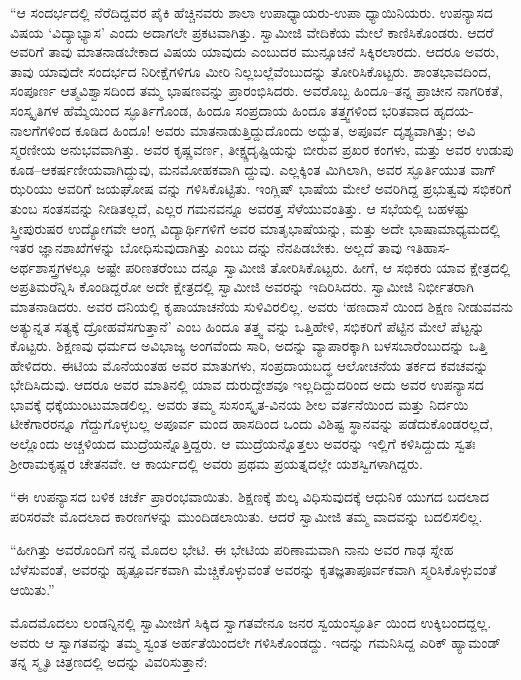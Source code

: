 “ಆ ಸಂದರ್ಭದಲ್ಲಿ ನೆರೆದಿದ್ದವರ ಪೈಕಿ ಹೆಚ್ಚಿನವರು ಶಾಲಾ ಉಪಾಧ್ಯಾಯರು-ಉಪಾ ಧ್ಯಾಯಿನಿಯರು. ಉಪನ್ಯಾಸದ ವಿಷಯ ‘ವಿದ್ಯಾಭ್ಯಾಸ’ ಎಂದು ಅದಾಗಲೇ ಪ್ರಕಟವಾಗಿತ್ತು. ಸ್ವಾಮೀಜಿ ವೇದಿಕೆಯ ಮೇಲೆ ಕಾಣಿಸಿಕೊಂಡರು. ಆದರೆ ಅವರಿಗೆ ತಾವು ಮಾತನಾಡಬೇಕಾದ ವಿಷಯ ಯಾವುದು ಎಂಬುದರ ಮುನ್ಸೂಚನೆ ಸಿಕ್ಕಿರಲಾರದು. ಆದರೂ ಅವರು, ತಾವು ಯಾವುದೇ ಸಂದರ್ಭದ ನಿರೀಕ್ಷೆಗಳಿಗೂ ಮೀರಿ ನಿಲ್ಲಬಲ್ಲೆವೆಂಬುದನ್ನು ತೋರಿಸಿಕೊಟ್ಟರು. ಶಾಂತಭಾವದಿಂದ, ಸಂಪೂರ್ಣ ಆತ್ಮವಿಶ್ವಾಸದಿಂದ ತಮ್ಮ ಭಾಷಣವನ್ನು ಪ್ರಾರಂಭಿಸಿದರು. ಅವರೊಬ್ಬ ಹಿಂದೂ–ತನ್ನ ಪ್ರಾಚೀನ ನಾಗರಿಕತೆ, ಸಂಸ್ಕೃತಿಗಳ ಹೆಮ್ಮೆಯಿಂದ ಸ್ಫೂರ್ತಿಗೊಂಡ, ಹಿಂದೂ ಸಂಪ್ರದಾಯ ಹಿಂದೂ ತತ್ತ್ವಗಳಿಂದ ಭರಿತವಾದ ಹೃದಯ-ನಾಲಗೆಗಳಿಂದ ಕೂಡಿದ ಹಿಂದೂ! ಅವರು ಮಾತನಾಡುತ್ತಿದ್ದುದೊಂದು ಅದ್ಭುತ, ಅಪೂರ್ವ ದೃಶ್ಯವಾಗಿತ್ತು; ಅವಿ ಸ್ಮರಣೀಯ ಅನುಭವವಾಗಿತ್ತು. ಅವರ ಕೃಷ್ಣವರ್ಣ, ತೀಕ್ಷ್ಣದೃಷ್ಟಿಯನ್ನು ಬೀರುವ ಪ್ರಖರ ಕಂಗಳು, ಮತ್ತು ಅವರ ಉಡುಪು ಕೂಡ–ಆಕರ್ಷಣೀಯವಾಗಿದ್ದುವು, ಮನಮೋಹಕವಾಗಿ ದ್ದುವು. ಎಲ್ಲಕ್ಕಿಂತ ಮಿಗಿಲಾಗಿ, ಅವರ ಸ್ಫೂರ್ತಿಯುತ ವಾಗ್​ಝರಿಯು ಅವರಿಗೆ ಜಯಘೋಷ ವನ್ನು ಗಳಿಸಿಕೊಟ್ಟಿತು. ಇಂಗ್ಲಿಷ್ ಭಾಷೆಯ ಮೇಲೆ ಅವರಿಗಿದ್ದ ಪ್ರಭುತ್ವವು ಸಭಿಕರಿಗೆ ತುಂಬ ಸಂತಸವನ್ನು ನೀಡಿತಲ್ಲದೆ, ಎಲ್ಲರ ಗಮನವನ್ನೂ ಅವರತ್ತ ಸೆಳೆಯುವಂತಿತ್ತು. ಆ ಸಭೆಯಲ್ಲಿ ಬಹಳಷ್ಟು ಸ್ತ್ರೀಪುರುಷರ ಉದ್ಯೋಗವೇ ಆಂಗ್ಲ ವಿದ್ಯಾರ್ಥಿಗಳಿಗೆ ಅವರ ಮಾತೃಭಾಷೆಯನ್ನು, ಮತ್ತು ಅದೇ ಭಾಷಾಮಾಧ್ಯಮದಲ್ಲಿ ಇತರ ಜ್ಞಾನಶಾಖೆಗಳನ್ನು ಬೋಧಿಸುವುದಾಗಿತ್ತು ಎಂಬು ದನ್ನು ನೆನಪಿಡಬೇಕು. ಅಲ್ಲದೆ ತಾವು ಇತಿಹಾಸ-ಅರ್ಥಶಾಸ್ತ್ರಗಳಲ್ಲೂ ಅಷ್ಟೇ ಪರಿಣತರೆಂಬು ದನ್ನೂ ಸ್ವಾಮೀಜಿ ತೋರಿಸಿಕೊಟ್ಟರು. ಹೀಗೆ, ಆ ಸಭಿಕರು ಯಾವ ಕ್ಷೇತ್ರದಲ್ಲಿ ಅಪ್ರತಿಮರೆನ್ನಿಸಿ ಕೊಂಡಿದ್ದರೋ ಅದೇ ಕ್ಷೇತ್ರದಲ್ಲಿ ಸ್ವಾಮೀಜಿ ಅವರನ್ನು ಇದಿರಿಸಿದರು. ಸ್ವಾಮೀಜಿ ನಿರ್ಭೀತರಾಗಿ ಮಾತನಾಡಿದರು. ಅವರ ದನಿಯಲ್ಲಿ ಕೃಪಾಯಾಚನೆಯ ಸುಳಿವಿರಲಿಲ್ಲ. ಅವರು ‘ಹಣದಾಸೆ ಯಿಂದ ಶಿಕ್ಷಣ ನೀಡುವವನು ಅತ್ಯುನ್ನತ ಸತ್ಯಕ್ಕೆ ದ್ರೋಹವೆಸಗುತ್ತಾನೆ’ ಎಂಬ ಹಿಂದೂ ತತ್ತ್ವ ವನ್ನು ಒತ್ತಿಹೇಳಿ, ಸಭಿಕರಿಗೆ ಪೆಟ್ಟಿನ ಮೇಲೆ ಪೆಟ್ಟನ್ನು ಕೊಟ್ಟರು. ಶಿಕ್ಷಣವು ಧರ್ಮದ ಅವಿಭಾಜ್ಯ ಅಂಗವೆಂದು ಸಾರಿ, ಅದನ್ನು ವ್ಯಾಪಾರಕ್ಕಾಗಿ ಬಳಸಬಾರೆಂಬುದನ್ನು ಒತ್ತಿ ಹೇಳಿದರು. ಈಟಿಯ ಮೊನೆಯಂತಹ ಅವರ ಮಾತುಗಳು, ಸಂಪ್ರದಾಯಬದ್ಧ ಆಲೋಚನೆಯ ತರ್ಕದ ಕವಚವನ್ನು ಭೇದಿಸಿದುವು. ಆದರೂ ಅವರ ಮಾತಿನಲ್ಲಿ ಯಾವ ದುರುದ್ದೇಶವೂ ಇಲ್ಲದಿದ್ದುದರಿಂದ ಅದು ಅವರ ಉಪನ್ಯಾಸದ ಭಾವಕ್ಕೆ ಧಕ್ಕೆಯುಂಟುಮಾಡಲಿಲ್ಲ. ಅವರು ತಮ್ಮ ಸುಸಂಸ್ಕೃತ-ವಿನಯ ಶೀಲ ವರ್ತನೆಯಿಂದ ಮತ್ತು ನಿರ್ದಯಿ ಟೀಕೆಗಾರರನ್ನೂ ಗೆದ್ದುಗೊಳ್ಳಬಲ್ಲ ಅಪೂರ್ವ ಮಂದ ಹಾಸದಿಂದ ಒಂದು ವಿಶಿಷ್ಟ ಸ್ಥಾನವನ್ನು ಪಡೆದುಕೊಂಡರಲ್ಲದೆ, ಅಲ್ಲೊಂದು ಅಚ್ಚಳಿಯದ ಮುದ್ರೆಯನ್ನೊತ್ತಿದ್ದರು. ಆ ಮುದ್ರೆಯನ್ನೊತ್ತಲು ಅವರನ್ನು ಇಲ್ಲಿಗೆ ಕಳಿಸಿದ್ದುದು ಸ್ವತಃ ಶ್ರೀರಾಮಕೃಷ್ಣರ ಚೇತನವೇ. ಆ ಕಾರ್ಯದಲ್ಲಿ ಅವರು ಪ್ರಥಮ ಪ್ರಯತ್ನದಲ್ಲೇ ಯಶಸ್ವಿಗಳಾಗಿದ್ದರು.

“ಈ ಉಪನ್ಯಾಸದ ಬಳಿಕ ಚರ್ಚೆ ಪ್ರಾರಂಭವಾಯಿತು. ಶಿಕ್ಷಣಕ್ಕೆ ಶುಲ್ಕ ವಿಧಿಸುವುದಕ್ಕೆ ಆಧುನಿಕ ಯುಗದ ಬದಲಾದ ಪರಿಸರವೇ ಮೊದಲಾದ ಕಾರಣಗಳನ್ನು ಮುಂದಿಡಲಾಯಿತು. ಆದರೆ ಸ್ವಾಮೀಜಿ ತಮ್ಮ ವಾದವನ್ನು ಬದಲಿಸಲಿಲ್ಲ.

“ಹೀಗಿತ್ತು ಅವರೊಂದಿಗೆ ನನ್ನ ಮೊದಲ ಭೇಟಿ. ಈ ಭೇಟಿಯ ಪರಿಣಾಮವಾಗಿ ನಾನು ಅವರ ಗಾಢ ಸ್ನೇಹ ಬೆಳೆಸುವಂತೆ, ಅವರನ್ನು ಹೃತ್ಪೂರ್ವಕವಾಗಿ ಮೆಚ್ಚಿಕೊಳ್ಳುವಂತೆ ಅವರನ್ನು ಕೃತಜ್ಞತಾಪೂರ್ವಕವಾಗಿ ಸ್ಮರಿಸಿಕೊಳ್ಳುವಂತೆ ಆಯಿತು.”

ಮೊದಮೊದಲು ಲಂಡನ್ನಿನಲ್ಲಿ ಸ್ವಾಮೀಜಿಗೆ ಸಿಕ್ಕಿದ ಸ್ವಾಗತವೇನೂ ಜನರ ಸ್ವಯಂಸ್ಫೂರ್ತಿ ಯಿಂದ ಉಕ್ಕಿಬಂದದ್ದಲ್ಲ. ಅವರು ಆ ಸ್ವಾಗತವನ್ನು ತಮ್ಮ ಸ್ವಂತ ಅರ್ಹತೆಯಿಂದಲೇ ಗಳಿಸಿಕೊಂಡದ್ದು. ಇದನ್ನು ಗಮನಿಸಿದ್ದ ಎರಿಕ್ ಹ್ಯಾಮಂಡ್ ತನ್ನ ಸ್ಮೃತಿ ಚಿತ್ರಣದಲ್ಲಿ ಅದನ್ನು ವಿವರಿಸುತ್ತಾನೆ:

